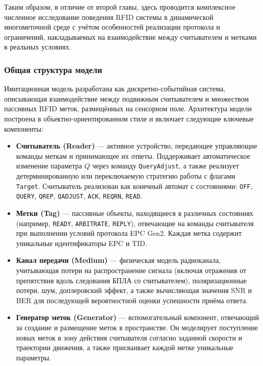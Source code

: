 \documentclass[12pt]{article}
\theoremstyle{definition}
\begin{document}
Таким образом, в отличие от второй главы, здесь проводится комплексное численное исследование поведения RFID системы в динамической многометочной среде с учётом особенностей реализации протокола и ограничений, накладываемых на взаимодействие между считывателем и метками в реальных условиях.


\subsubsection{Общая структура модели}

Имитационная модель разработана как дискретно-событийная система, описывающая взаимодействие между подвижным считывателем и множеством пассивных RFID меток, размещённых на сенсорном поле. Архитектура модели построена в объектно-ориентированном стиле и включает следующие ключевые компоненты:

\begin{itemize}
    \item \textbf{Считыватель (Reader)} --- активное устройство, передающее управляющие команды меткам и принимающее их ответы. Поддерживает автоматическое изменение параметра $Q$ через команду \texttt{QueryAdjust}, а также реализует детерминированную или переключаемую стратегию работы с флагами \texttt{Target}. Считыватель реализован как конечный автомат с состояниями: \texttt{OFF}, \texttt{QUERY}, \texttt{QREP}, \texttt{QADJUST}, \texttt{ACK}, \texttt{REQRN}, \texttt{READ}.
    
    \item \textbf{Метки (Tag)} --- пассивные объекты, находящиеся в различных состояниях (например, \texttt{READY}, \texttt{ARBITRATE}, \texttt{REPLY}), отвечающие на команды считывателя при выполнении условий протокола EPC Gen2. Каждая метка содержит уникальные идентификаторы EPC и TID.
    
    \item \textbf{Канал передачи (Medium)} --- физическая модель радиоканала, учитывающая потери на распространение сигнала (включая отражения от препятствия вдоль следования БПЛА со считывателем), поляризационные потери, шум, доплеровский эффект, а также вычисляющая значения SNR и BER для последующей вероятностной оценки успешности приёма ответа.
    
    \item \textbf{Генератор меток (Generator)} --- вспомогательный компонент, отвечающий за создание и размещение меток в пространстве. Он моделирует поступление новых меток в зону действия считывателя согласно заданной скорости и траектории движения, а также присваивает каждой метке уникальные параметры.
\end{itemize}
\end{document}
